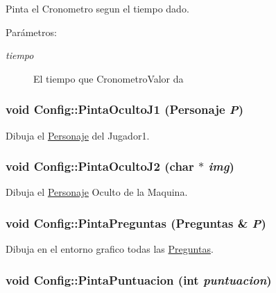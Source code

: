 Pinta el Cronometro segun el tiempo dado. 

\begin{Desc}
\item[Parámetros:]
\begin{description}
\item[{\em tiempo}]El tiempo que CronometroValor da \end{description}
\end{Desc}
\hypertarget{class_config_a65b0dec7dbb915a147f0e1a48177cfc}{
\subsubsection[{PintaOcultoJ1}]{\setlength{\rightskip}{0pt plus 5cm}void Config::PintaOcultoJ1 ({\bf Personaje} {\em P})}}
\label{class_config_a65b0dec7dbb915a147f0e1a48177cfc}


Dibuja el \hyperlink{class_personaje}{Personaje} del Jugador1. 

\hypertarget{class_config_1d4493399b5138963924586b02daf6ad}{
\subsubsection[{PintaOcultoJ2}]{\setlength{\rightskip}{0pt plus 5cm}void Config::PintaOcultoJ2 (char $\ast$ {\em img})}}
\label{class_config_1d4493399b5138963924586b02daf6ad}


Dibuja el \hyperlink{class_personaje}{Personaje} Oculto de la Maquina. 

\hypertarget{class_config_69dbcf835071f978ec360958ee54860e}{
\subsubsection[{PintaPreguntas}]{\setlength{\rightskip}{0pt plus 5cm}void Config::PintaPreguntas ({\bf Preguntas} \& {\em P})}}
\label{class_config_69dbcf835071f978ec360958ee54860e}


Dibuja en el entorno grafico todas las \hyperlink{class_preguntas}{Preguntas}. 

\hypertarget{class_config_4f1b69ffddd53323755b960ceaa07281}{
\subsubsection[{PintaPuntuacion}]{\setlength{\rightskip}{0pt plus 5cm}void Config::PintaPuntuacion (int {\em puntuacion})}}
\label{class_config_4f1b69ffddd53323755b960ceaa07281}


